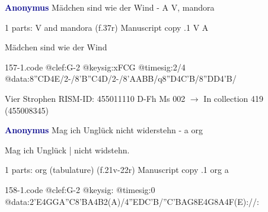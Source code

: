 \documentclass[twocolumn]{book}
\begin{document}
\newline \par \vspace{7pt} \textcolor{darkblue}{\textbf{Anonymus  }}
\newline Mädchen sind wie der Wind - A
\newline V, mandora
\newline \begin{itshape}\end{itshape} 
\newline \textcolor{darkblue}{}  1 parts: V and mandora  (f.37r)
\newline Manuscript copy
.1  V  A
\newline \begin{footnotesize} Mädchen sind wie der Wind \end{footnotesize}  
\begin{filecontents*}{157-1.code}
@clef:G-2
@keysig:xFCG
@timesig:2/4
@data:8''CD4E/2-/8'B''C4D/2-/8'AABB/q8''D4C'B/8''DD4'B/
\end{filecontents*}
\newline
%

\newline Vier Strophen
\newline RISM-ID: 455011110
\newline D-Fh  Ms 002
\newline $\rightarrow$ In collection 419 (455008345)
      
\newline \par \vspace{7pt} \textcolor{darkblue}{\textbf{Anonymus  }}
\newline Mag ich Unglück nicht widerstehn - a
\newline org
\newline \begin{itshape}[f.21v, at left:] Mag ich Unglück | nicht widstehn.\end{itshape} 
\newline \textcolor{darkblue}{}  1 parts: org (tabulature)  (f.21v-22r)
\newline Manuscript copy
.1  org  a  
\begin{filecontents*}{158-1.code}
@clef:G-2
@keysig:
@timesig:0
@data:2'E4GGA''C{8'BA}4B2(A)/4''EDC'B/''C'BAG8E4G8A4F(E)://:
\end{filecontents*}
\newline
%
\end{document}
